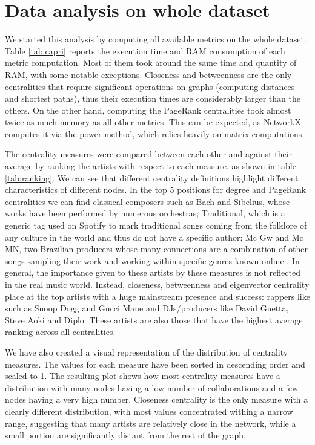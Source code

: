 \section{Data analysis on whole dataset}

We started this analysis by computing all available metrics on the whole dataset. Table \ref{tab:capri} reports the execution time and RAM consumption of each metric computation. Most of them took around the same time and quantity of RAM, with some notable exceptions. Closeness and betweenness are the only centralities that require significant operations on graphs (computing distances and shortest paths), thus their execution times are considerably larger than the others. On the other hand, computing the PageRank centralities took almost twice as much memory as all other metrics. This can be expected, as NetworkX computes it via the power method, which relies heavily on matrix computations.

The centrality measures were compared between each other and against their average by ranking the artists with respect to each measure, as shown in table \ref{tab:ranking}. We can see that different centrality definitions highlight different characteristics of different nodes. In the top 5 positions for degree and PageRank centralities we can find classical composers such as Bach and Sibelius, whose works have been performed by numerous orchestras; Traditional, which is a generic tag used on Spotify to mark traditional songs coming from the folklore of any culture in the world and thus do not have a specific author; Mc Gw and Mc MN, two Brazilian producers whose many connections are a combination of other songs sampling their work and working within specific genres known online \cite{brazilianArtists}. In general, the importance given to these artists by these measures is not reflected in the real music world. Instead, closeness, betweenness and eigenvector centrality place at the top artists with a huge mainstream presence and success: rappers like such as Snoop Dogg and Gucci Mane and DJs/producers like David Guetta, Steve Aoki and Diplo. These artists are also those that have the highest average ranking across all centralities.

We have also created a visual representation of the distribution of centrality measures. The values for each measure have been sorted in descending order and scaled to 1. The resulting plot shows how most centrality measures have a distribution with many nodes having a low number of collaborations and a few nodes having a very high number. Closeness centrality is the only measure with a clearly different distribution, with most values concentrated withing a narrow range, suggesting that many artists are relatively close in the network, while a small portion are significantly distant from the rest of the graph.

